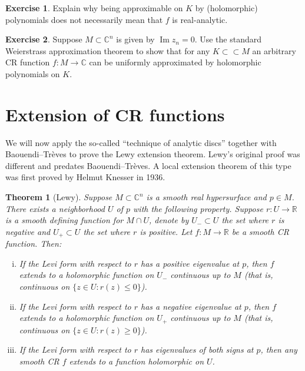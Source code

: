 \documentclass[12pt,openany]{book}
\renewcommand{\Im}{\operatorname{Im}}
\newcommand{\C}{{\mathbb{C}}}
\newcommand{\R}{{\mathbb{R}}}
\theoremstyle{plain}
\newtheorem{thm}{Theorem}[section]
\theoremstyle{remark}
\theoremstyle{definition}
\newenvironment{exbox}{%
    \def\FrameCommand{\vrule width 1pt \relax\hspace {10pt}}%
    \MakeFramed {\advance \hsize -\width \FrameRestore }%
}{%
    \endMakeFramed
}
\theoremstyle{exercise}
\newtheorem{exercise}{Exercise}[section]
\theoremstyle{example}
\begin{document}
\begin{exbox}
\begin{exercise}
Explain why being approximable on $K$ by (holomorphic) polynomials does not
necessarily mean that
$f$ is real-analytic.
\end{exercise}

\begin{exercise}
Suppose $M \subset \C^n$ is given by $\Im z_n = 0$.  Use the standard
Weierstrass approximation theorem to show that for any $K \subset \subset M$
an arbitrary CR function $f \colon M \to \C$ can be uniformly approximated
by holomorphic polynomials on $K$.
\end{exercise}
\end{exbox}


\section{Extension of CR functions}

We will now apply the so-called ``technique of analytic discs'' together
with
Baouendi--Tr{\`e}ves to prove the
Lewy extension theorem.  Lewy's original proof was different
and predates Baouendi--Tr{\`e}ves.  A local extension theorem of this type
was first proved by Helmut Knesser in 1936.

\begin{thm}[Lewy]%
Suppose $M \subset \C^n$ is a smooth real hypersurface and $p \in M$.
There exists a neighborhood $U$ of $p$ with the following
property.
Suppose $r \colon U \to \R$ is
a smooth defining function for $M \cap U$, denote by $U_- \subset U$ the set where $r$
is negative and $U_+ \subset U$ the set where $r$ is positive.
Let $f \colon M \to \R$ be a smooth CR function.
Then:

\begin{enumerate}[(i)]
\item
If the Levi form with respect to $r$ has a positive eigenvalue at $p$, then
$f$ extends to a holomorphic function on $U_-$ continuous up to $M$
(that is, continuous on $\{ z \in U : r(z) \leq 0 \}$).
\item
If the Levi form with respect to $r$ has a negative eigenvalue at $p$, then
$f$ extends to a holomorphic function on $U_+$ continuous up to $M$
(that is, continuous on $\{ z \in U : r(z) \geq 0 \}$).
\item
If the Levi form with respect to $r$ has eigenvalues of both signs at $p$, then any smooth
CR $f$ extends to
a function holomorphic on $U$.
\end{enumerate}
\end{thm}
\end{document}
